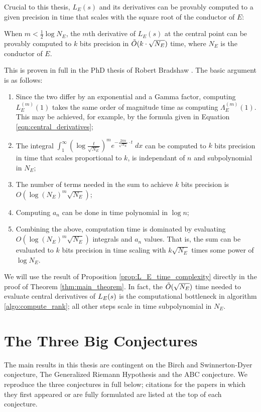 Crucial to this thesis, $L_E(s)$ and its derivatives can be provably computed to a given precision in time that scales with the square root of the conductor of $E$:
\begin{proposition}\label{prop:L_E_time_complexity}
When $m<\frac{1}{2} \log N_E$, the $m$th derivative of $L_E(s)$ at the central point can be provably computed to $k$ bits precision in $\tilde{O}(k\cdot \sqrt{N_E})$ time, where $N_E$ is the conductor of $E$.
\end{proposition}
This is proven in full in the PhD thesis of Robert Bradshaw \cite{Bra-2010}. The basic argument is as follows:
\begin{enumerate}
\item Since the two differ by an exponential and a Gamma factor, computing $L_E^{(m)}(1)$ takes the same order of magnitude time as computing $\Lambda_E^{(m)}(1)$. This may be achieved, for example, by the formula given in Equation \ref{eqn:central_derivatives};
\item The integral $\int_{1}^{\infty} \left(\log \frac{t}{\sqrt{N_E}}\right)^m e^{-\frac{2\pi n}{\sqrt{N_E}}\cdot t} \; dx$ can be computed to $k$ bits precision in time that scales proportional to $k$, is independant of $n$ and subpolynomial in $N_E$;
\item The number of terms needed in the sum to achieve $k$ bits precision is $O\left( \log(N_E)^m\sqrt{N_E}\right)$;
\item Computing $a_n$ can be done in time polynomial in $\log n$;
\item Combining the above, computation time is dominated by evaluating $O( \log(N_E)^m\sqrt{N_E})$ integrals and $a_n$ values. That is, the sum can be evaluated to $k$ bits precision in time scaling with $k \sqrt{N_E}$ times some power of $\log N_E$.
\end{enumerate}
We will use the result of Proposition \ref{prop:L_E_time_complexity} directly in the proof of Theorem \ref{thm:main_theorem}. In fact, the $\tilde{O}(\sqrt{N_E})$ time needed to evaluate central derivatives of $L_E(s)$ is the computational bottleneck in algorithm \ref{algo:compute_rank}; all other steps scale in time subpolynomial in $N_E$. 


\newpage
\section{The Three Big Conjectures}\label{sec:conjectures}

The main results in this thesis are contingent on the Birch and Swinnerton-Dyer conjecture, The Generalized Riemann Hypothesis and the ABC conjecture. We reproduce the three conjectures in full below; citations for the papers in which they first appeared or are fully formulated are listed at the top of each conjecture. \\

